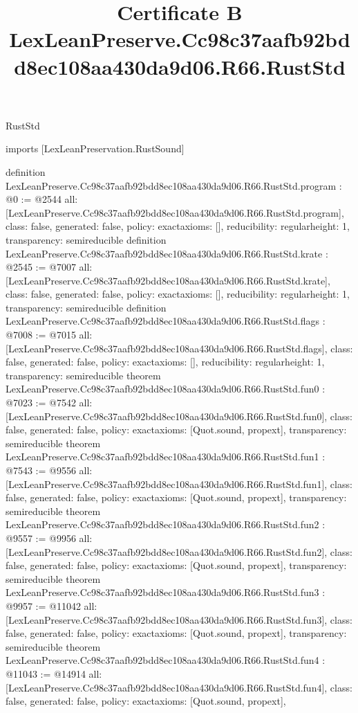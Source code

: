 \begin{lexlean}{RustStd}
\title{Certificate B LexLeanPreserve.Cc98c37aafb92bdd8ec108aa430da9d06.R66.RustStd}
\begin{coremodule}
imports [LexLeanPreservation.RustSound]

definition LexLeanPreserve.Cc98c37aafb92bdd8ec108aa430da9d06.R66.RustStd.program : @0 := @2544 {
  all: [LexLeanPreserve.Cc98c37aafb92bdd8ec108aa430da9d06.R66.RustStd.program],
  class: false,
  generated: false,
  policy: exact{axioms: []},
  reducibility: regular{height: 1},
  transparency: semireducible
}
definition LexLeanPreserve.Cc98c37aafb92bdd8ec108aa430da9d06.R66.RustStd.krate : @2545 := @7007 {
  all: [LexLeanPreserve.Cc98c37aafb92bdd8ec108aa430da9d06.R66.RustStd.krate],
  class: false,
  generated: false,
  policy: exact{axioms: []},
  reducibility: regular{height: 1},
  transparency: semireducible
}
definition LexLeanPreserve.Cc98c37aafb92bdd8ec108aa430da9d06.R66.RustStd.flags : @7008 := @7015 {
  all: [LexLeanPreserve.Cc98c37aafb92bdd8ec108aa430da9d06.R66.RustStd.flags],
  class: false,
  generated: false,
  policy: exact{axioms: []},
  reducibility: regular{height: 1},
  transparency: semireducible
}
theorem LexLeanPreserve.Cc98c37aafb92bdd8ec108aa430da9d06.R66.RustStd.fun0 : @7023 := @7542 {
  all: [LexLeanPreserve.Cc98c37aafb92bdd8ec108aa430da9d06.R66.RustStd.fun0],
  class: false,
  generated: false,
  policy: exact{axioms: [Quot.sound, propext]},
  transparency: semireducible
}
theorem LexLeanPreserve.Cc98c37aafb92bdd8ec108aa430da9d06.R66.RustStd.fun1 : @7543 := @9556 {
  all: [LexLeanPreserve.Cc98c37aafb92bdd8ec108aa430da9d06.R66.RustStd.fun1],
  class: false,
  generated: false,
  policy: exact{axioms: [Quot.sound, propext]},
  transparency: semireducible
}
theorem LexLeanPreserve.Cc98c37aafb92bdd8ec108aa430da9d06.R66.RustStd.fun2 : @9557 := @9956 {
  all: [LexLeanPreserve.Cc98c37aafb92bdd8ec108aa430da9d06.R66.RustStd.fun2],
  class: false,
  generated: false,
  policy: exact{axioms: [Quot.sound, propext]},
  transparency: semireducible
}
theorem LexLeanPreserve.Cc98c37aafb92bdd8ec108aa430da9d06.R66.RustStd.fun3 : @9957 := @11042 {
  all: [LexLeanPreserve.Cc98c37aafb92bdd8ec108aa430da9d06.R66.RustStd.fun3],
  class: false,
  generated: false,
  policy: exact{axioms: [Quot.sound, propext]},
  transparency: semireducible
}
theorem LexLeanPreserve.Cc98c37aafb92bdd8ec108aa430da9d06.R66.RustStd.fun4 : @11043 := @14914 {
  all: [LexLeanPreserve.Cc98c37aafb92bdd8ec108aa430da9d06.R66.RustStd.fun4],
  class: false,
  generated: false,
  policy: exact{axioms: [Quot.sound, propext]},
}
\end{coremodule}
\end{lexlean}
